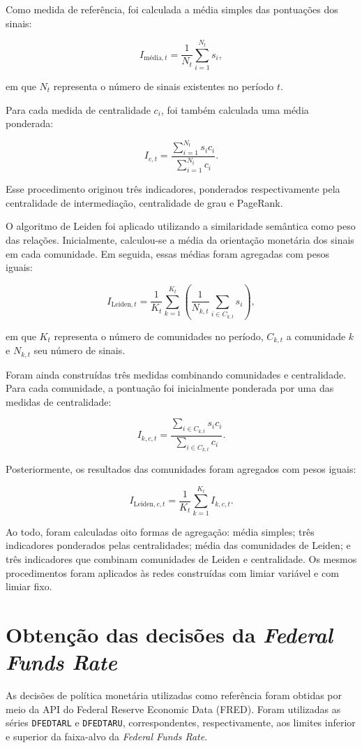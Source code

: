Como medida de referência, foi calculada a média simples das pontuações dos
sinais:

\[
I_{\text{média},t}
=
\frac{1}{N_t}
\sum_{i=1}^{N_t}s_i,
\]

em que $N_t$ representa o número de sinais existentes no período $t$.

Para cada medida de centralidade $c_i$, foi também calculada uma média ponderada:

\[
I_{c,t}
=
\frac{
\sum_{i=1}^{N_t}s_i c_i
}{
\sum_{i=1}^{N_t}c_i
}.
\]

Esse procedimento originou três indicadores, ponderados respectivamente pela
centralidade de intermediação, centralidade de grau e PageRank.

O algoritmo de Leiden foi aplicado utilizando a similaridade semântica como
peso das relações. Inicialmente, calculou-se a média da orientação monetária dos
sinais em cada comunidade. Em seguida, essas médias foram agregadas com pesos
iguais:

\[
I_{\text{Leiden},t}
=
\frac{1}{K_t}
\sum_{k=1}^{K_t}
\left(
\frac{1}{N_{k,t}}
\sum_{i \in C_{k,t}}s_i
\right),
\]

em que $K_t$ representa o número de comunidades no período, $C_{k,t}$ a
comunidade $k$ e $N_{k,t}$ seu número de sinais.

Foram ainda construídas três medidas combinando comunidades e centralidade. Para
cada comunidade, a pontuação foi inicialmente ponderada por uma das medidas de
centralidade:

\[
I_{k,c,t}
=
\frac{
\sum_{i\in C_{k,t}}s_i c_i
}{
\sum_{i\in C_{k,t}}c_i
}.
\]

Posteriormente, os resultados das comunidades foram agregados com pesos iguais:

\[
I_{\text{Leiden},c,t}
=
\frac{1}{K_t}
\sum_{k=1}^{K_t}I_{k,c,t}.
\]

Ao todo, foram calculadas oito formas de agregação: média simples; três
indicadores ponderados pelas centralidades; média das comunidades de Leiden; e
três indicadores que combinam comunidades de Leiden e centralidade. Os mesmos
procedimentos foram aplicados às redes construídas com limiar variável e com
limiar fixo.

\section{Obtenção das decisões da \textit{Federal Funds Rate}}

As decisões de política monetária utilizadas como referência foram obtidas por
meio da API do Federal Reserve Economic Data (FRED). Foram utilizadas as séries
\texttt{DFEDTARL} e \texttt{DFEDTARU}, correspondentes, respectivamente, aos
limites inferior e superior da faixa-alvo da \textit{Federal Funds Rate}.

